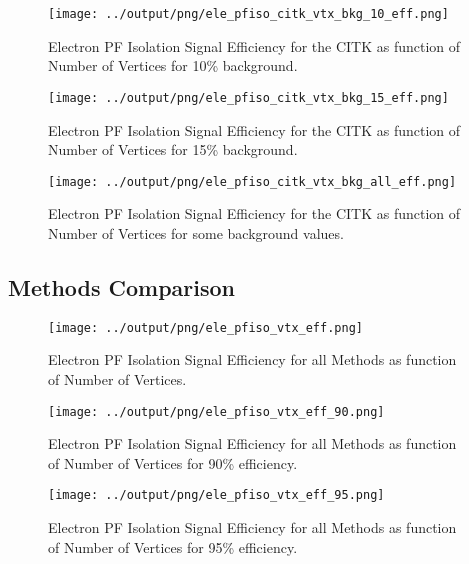 \documentclass[11pt]{book}
\begin{document}
\begin{figure}[htb]
\centering
\texttt{[image: ../output/png/ele\_pfiso\_citk\_vtx\_bkg\_10\_eff.png]}
\caption{Electron PF Isolation Signal Efficiency for the CITK as function of Number of Vertices for 10\% background.}
\label{fig:ele_pfiso_vtx_eff_citk_bkg_10_eff}
\end{figure}

\begin{figure}[htb]
\centering
\texttt{[image: ../output/png/ele\_pfiso\_citk\_vtx\_bkg\_15\_eff.png]}
\caption{Electron PF Isolation Signal Efficiency for the CITK as function of Number of Vertices for 15\% background.}
\label{fig:ele_pfiso_vtx_eff_citk_bkg_15_eff}
\end{figure}

\begin{figure}[htb]
\centering
\texttt{[image: ../output/png/ele\_pfiso\_citk\_vtx\_bkg\_all\_eff.png]}
\caption{Electron PF Isolation Signal Efficiency for the CITK as function of Number of Vertices for some background values.}
\label{fig:ele_pfiso_vtx_eff_citk_bkg_all_eff}
\end{figure}
\clearpage

\subsection{Methods Comparison}
\begin{figure}[htb]
\centering
\texttt{[image: ../output/png/ele\_pfiso\_vtx\_eff.png]}
\caption{Electron PF Isolation Signal Efficiency for all Methods as function of Number of Vertices.}
\label{fig:ele_pfiso_vtx_eff}
\end{figure}

\begin{figure}[htb]
\centering
\texttt{[image: ../output/png/ele\_pfiso\_vtx\_eff\_90.png]}
\caption{Electron PF Isolation Signal Efficiency for all Methods as function of Number of Vertices for 90\% efficiency.}
\label{fig:ele_pfiso_vtx_eff_90}
\end{figure}

\begin{figure}[htb]
\centering
\texttt{[image: ../output/png/ele\_pfiso\_vtx\_eff\_95.png]}
\caption{Electron PF Isolation Signal Efficiency for all Methods as function of Number of Vertices for 95\% efficiency.}
\label{fig:ele_pfiso_vtx_eff_95}
\end{figure}
\end{document}
